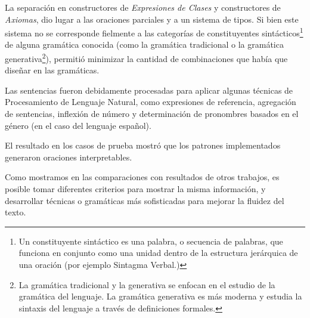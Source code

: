 La separación en constructores de \textit{Expresiones de Clases} y constructores de \textit{Axiomas}, dio lugar a las oraciones parciales y a un sistema de tipos. Si bien este sistema no se corresponde fielmente a las categorías de constituyentes sintácticos\footnote{Un constituyente sintáctico es una palabra, o secuencia de palabras, que funciona en conjunto como una unidad dentro de la estructura jerárquica de una oración (por ejemplo Sintagma Verbal.)} de alguna gramática conocida (como la gramática tradicional o la gramática generativa\footnote{La gramática tradicional y la generativa se enfocan en el estudio de la gramática del lenguaje. La gramática generativa es más moderna y estudia la sintaxis del lenguaje a través de definiciones formales.}), permitió minimizar la cantidad de combinaciones que había que diseñar en las gramáticas.

Las sentencias fueron debidamente procesadas para aplicar algunas técnicas de Procesamiento de Lenguaje Natural, como expresiones de referencia, agregación de sentencias, inflexión de número y determinación de pronombres basados en el género (en el caso del lenguaje español). 

El resultado en los casos de prueba mostró que los patrones implementados generaron oraciones interpretables.

Como mostramos en las comparaciones con resultados de otros trabajos, es posible tomar diferentes criterios para mostrar la misma información, y desarrollar técnicas o gramáticas más sofisticadas para mejorar la fluidez del texto.
